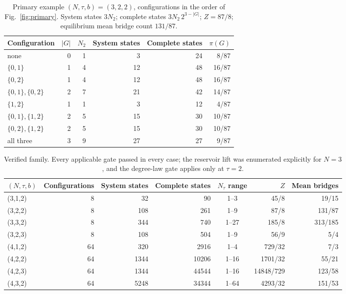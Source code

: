 \documentclass[aps,pre,preprint,superscriptaddress,nofootinbib]{revtex4-2}
\theoremstyle{definition}
\theoremstyle{remark}
\newcommand{\N}{N_\tau}
\begin{document}
\begin{table}[t]
\caption{Primary example $(N,\tau,b)=(3,2,2)$, configurations in the order of Fig.~\ref{fig:primary}. System states $3N_2$; complete states $3N_2\,2^{3-|G|}$; $Z=87/8$; equilibrium mean bridge count $131/87$.}
\label{tab:primary}
\begin{ruledtabular}
\begin{tabular}{lrrrrr}
Configuration & $|G|$ & $N_2$ & System states & Complete states & $\pi(G)$\\
\hline
none & 0 & 1 & 3 & 24 & 8/87\\
$\{0,1\}$ & 1 & 4 & 12 & 48 & 16/87\\
$\{0,2\}$ & 1 & 4 & 12 & 48 & 16/87\\
$\{0,1\},\{0,2\}$ & 2 & 7 & 21 & 42 & 14/87\\
$\{1,2\}$ & 1 & 1 & 3 & 12 & 4/87\\
$\{0,1\},\{1,2\}$ & 2 & 5 & 15 & 30 & 10/87\\
$\{0,2\},\{1,2\}$ & 2 & 5 & 15 & 30 & 10/87\\
all three & 3 & 9 & 27 & 27 & 9/87
\end{tabular}
\end{ruledtabular}
\end{table}

\begin{table}[t]
\caption{Verified family. Every applicable gate passed in every case; the reservoir lift was enumerated explicitly for $N=3$, and the degree-law gate applies only at $\tau=2$.}
\label{tab:family}
\begin{ruledtabular}
\begin{tabular}{lrrrcrr}
$(N,\tau,b)$ & Configurations & System states & Complete states & $\N$ range & $Z$ & Mean bridges\\
\hline
(3,1,2) & 8 & 32 & 90 & 1--3 & 45/8 & 19/15\\
(3,2,2) & 8 & 108 & 261 & 1--9 & 87/8 & 131/87\\
(3,3,2) & 8 & 344 & 740 & 1--27 & 185/8 & 313/185\\
(3,2,3) & 8 & 108 & 504 & 1--9 & 56/9 & 5/4\\
(4,1,2) & 64 & 320 & 2916 & 1--4 & 729/32 & 7/3\\
(4,2,2) & 64 & 1344 & 10206 & 1--16 & 1701/32 & 55/21\\
(4,2,3) & 64 & 1344 & 44544 & 1--16 & 14848/729 & 123/58\\
(4,3,2) & 64 & 5248 & 34344 & 1--64 & 4293/32 & 151/53
\end{tabular}
\end{ruledtabular}
\end{table}
\end{document}
